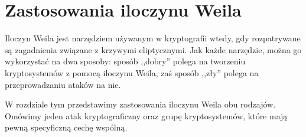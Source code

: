 \chapter{Zastosowania iloczynu Weila}

\noindent
Iloczyn Weila jest narzędziem używanym w kryptografii wtedy,
gdy rozpatrywane są zagadnienia związane z krzywymi eliptycznymi.
Jak każde narzędzie, można go wykorzystać na dwa sposoby:
sposób ,,dobry'' polega na tworzeniu kryptosystemów z pomocą iloczynu Weila,
zaś sposób ,,zły'' polega na przeprowadzaniu ataków na nie.

\noindent
W rozdziale tym przedstawimy zastosowania iloczynu Weila obu rodzajów.
Omówimy jeden atak kryptograficzny
oraz grupę kryptosystemów,
które mają pewną specyficzną cechę wspólną.






